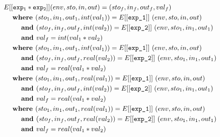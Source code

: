 \documentclass[12pt]{article}
\newcommand\eb[1]{[[\texttt{#1}]]}
\begin{document}
\begin{align*}
&E[[{\tt exp_1 * exp_2}]] (env,sto,in,out) = (sto_f,in_f,out_f,val_f)\\
&\hspace{3ex}\textbf{where } (sto_1,in_1,out_1,int(val_1)) = E\eb{exp\_1}\ (env,sto,in,out) \\
&\hspace{6ex}\textbf{and } (sto_f,in_f,out_f,int(val_2)) = E\eb{exp\_2}\ (env,sto_1,in_1,out_1) \\
&\hspace{6ex}\textbf{and } val_f = int(val_1 * val_2) \\
&\hspace{3ex}\textbf{where } (sto_1,in_1,out_1,int(val_1)) = E\eb{exp\_1}\ (env,sto,in,out) \\
&\hspace{6ex}\textbf{and } (sto_f,in_f,out_f,real(val_2)) = E\eb{exp\_2}\ (env,sto_1,in_1,out_1) \\
&\hspace{6ex}\textbf{and } val_f = real(val_1 * val_2) \\
&\hspace{3ex}\textbf{where } (sto_1,in_1,out_1,real(val_1)) = E\eb{exp\_1}\ (env,sto,in,out) \\
&\hspace{6ex}\textbf{and } (sto_f,in_f,out_f,int(val_2)) = E\eb{exp\_2}\ (env,sto_1,in_1,out_1) \\
&\hspace{6ex}\textbf{and } val_f = real(val_1 * val_2) \\
&\hspace{3ex}\textbf{where } (sto_1,in_1,out_1,real(val_1)) = E\eb{exp\_1}\ (env,sto,in,out) \\
&\hspace{6ex}\textbf{and } (sto_f,in_f,out_f,real(val_2)) = E\eb{exp\_2}\ (env,sto_1,in_1,out_1) \\
&\hspace{6ex}\textbf{and } val_f = real(val_1 * val_2) \\
\end{align*}
\end{document}
